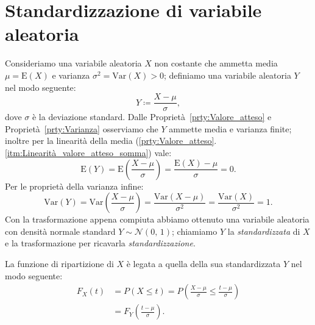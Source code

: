     \section{Standardizzazione di variabile aleatoria}
        \begin{defn}
            Consideriamo una variabile aleatoria $X$ non costante che ammetta media $\mu = \text{E}(X)$ e varianza $\sigma^2 = \text{Var}(X) > 0$; definiamo una variabile aleatoria $Y$ nel modo seguente:
            \begin{equation}\label{eq:Standardizzazione}
                Y \coloneqq \frac{X-\mu}{\sigma}
            ,\end{equation}
            dove $\sigma$ è la deviazione standard. Dalle Proprietà~\ref{prty:Valore_atteso} e Proprietà~\ref{prty:Varianza} osserviamo che $Y$ ammette media e varianza finite; inoltre per la linearità della media (\ref{prty:Valore_atteso}.\ref{itm:Linearità_valore_atteso_somma}) vale: \[
                \text{E}(Y) = \text{E}\left(\frac{X - \mu}{\sigma}\right) = \frac{\text{E}(X) - \mu}{\sigma} = 0
            .\] Per le proprietà della varianza infine: \[
            \text{Var}(Y) = \text{Var}\left(\frac{X - \mu}{\sigma}\right) = \frac{\text{Var}(X - \mu)}{\sigma^2} = \frac{\text{Var}(X)}{\sigma^2} = 1
        .\] Con la trasformazione appena compiuta abbiamo ottenuto una variabile aleatoria con densità normale standard $Y \sim \mathcal{N}(0,\,1)$; chiamiamo $Y$ la \emph{standardizzata} di $X$ e la trasformazione per ricavarla \emph{standardizzazione}.
        \end{defn}
        \begin{obsv}
            La funzione di ripartizione di $X$ è legata a quella della sua standardizzata $Y$ nel modo seguente:
            \begin{align*}
                F_X(t) &= P(X \leq t) = P\left(\frac{X - \mu}{\sigma} \leq \frac{t - \mu}{\sigma}\right) \\
                       &= F_Y\left(\frac{t - \mu}{\sigma}\right)
            .\end{align*}
        \end{obsv}
